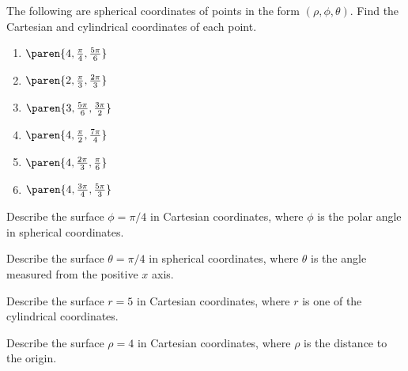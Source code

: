 \begin{ex}
The following are spherical coordinates of points in the form $(
\rho,\phi,\theta)$. Find the Cartesian and cylindrical
coordinates of each point.

\begin{enumerate}
\item $\paren{4,\frac{\pi }{4},\frac{5\pi }{6}} $

\item $\paren{2,\frac{\pi }{3},\frac{2\pi }{3}} $

\item $\paren{3,\frac{5\pi }{6},\frac{3\pi }{2}} $

\item $\paren{4,\frac{\pi }{2},\frac{7\pi }{4}} $

\item $\paren{4,\frac{2\pi }{3},\frac{\pi }{6}} $

\item $\paren{4,\frac{3\pi }{4},\frac{5\pi }{3}} $
\end{enumerate}
\end{ex}

\begin{ex} Describe the surface $\phi =\pi
/4$ in Cartesian coordinates, where $\phi $ is the polar angle in spherical coordinates.
\end{ex}

\begin{ex} Describe the surface $\theta =\pi /4$ in spherical coordinates, where $\theta $ is
the angle measured from the positive $x$ axis. 
\end{ex}

\begin{ex} Describe the surface $r=5$ in Cartesian coordinates, where 
$r$ is one of the cylindrical coordinates.
\end{ex}

\begin{ex} Describe the surface $\rho =4$ in Cartesian coordinates, 
where $\rho $ is the distance to the origin.
\end{ex}

